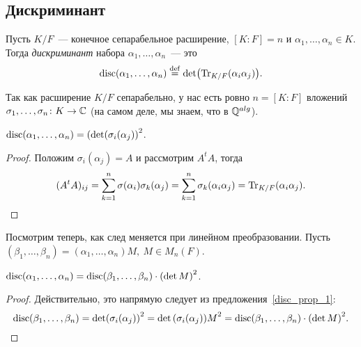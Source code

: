 
	\subsection{Дискриминант}

	\begin{definition}\label{discriminant} 
		Пусть $K/F$~--- конечное сепарабельное расширение, $[K : F] = n$ и $\alpha_1, \ldots, \alpha_n \in K$.
		Тогда \emph{дискриминант} набора $\alpha_1, \ldots, \alpha_n$~--- это 
		\[
			\disc(\alpha_1, \ldots, \alpha_n) \eqdef \det\lr*{\Tr_{K/F}(\alpha_i \alpha_j)}.
		\]

		Так как расширение $K/F$ сепарабельно, у нас есть ровно $n = [K : F]$ вложений $\sigma_1, \ldots, \sigma_n\colon K \to \C$ (на самом деле, мы знаем, что в  $\Q^{alg}$).

		\begin{statement}\label{disc_prop_1} 
			$\disc(\alpha_1, \ldots, \alpha_n) = \lr*{\det(\sigma_{i}(\alpha_j)}^{2}$.	
		\end{statement}
		\begin{proof}
			Положим $\sigma_{i}(\alpha_j) = A$ и рассмотрим $A^{t} A$, тогда 
			\[
				(A^{t} A)_{i j} = \sum_{k = 1}^{n} \sigma(\alpha_i) \sigma_k(\alpha_j) = \sum_{k = 1}^{n} \sigma_{k}(\alpha_i \alpha_j) = \Tr_{K/F}(\alpha_i \alpha_j).
			\]
		\end{proof}

		Посмотрим теперь, как след меняется при линейном преобразовании. Пусть $(\beta_1, \ldots, \beta_n) = (\alpha_1, \ldots, \alpha_n)M, \ M \in M_{n}(F)$.

		\begin{statement}\label{disc_prop_2} 
			$\disc(\alpha_1, \ldots, \alpha_n) = \disc(\beta_1, \ldots, \beta_n) \cdot \lr*{\det{M}}^{2}$.
		\end{statement}
		\begin{proof}
			Действительно, это напрямую следует из предложения~\ref{disc_prop_1}:
			\[
			 	\disc(\beta_1, \ldots, \beta_n) = \det\lr*{\sigma_{i}(\alpha_{j})}^{2} = \det{\lr*{\sigma_{i}(\alpha_{j})}M}^2 = \disc(\beta_1, \ldots, \beta_n) \cdot \lr*{\det{M}}^{2}. 
			 \] 
		\end{proof}


\end{definition}
